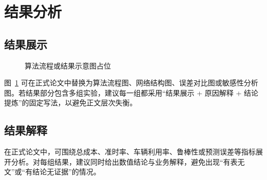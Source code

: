 \section{结果分析}

\subsection{结果展示}

\begin{figure}[H]
    \centering
    \fbox{\rule{0pt}{4.2cm}\rule{0.82\textwidth}{0pt}}
    \caption{算法流程或结果示意图占位}
    \label{fig:placeholder}
\end{figure}

图~\ref{fig:placeholder} 可在正式论文中替换为算法流程图、网络结构图、误差对比图或敏感性分析图。若结果部分包含多组实验，建议每一组都采用“结果展示 + 原因解释 + 结论提炼”的固定写法，以避免正文层次失衡。

\subsection{结果解释}

在正式论文中，可围绕总成本、准时率、车辆利用率、鲁棒性或预测误差等指标展开分析。对每组结果，建议同时给出数值结论与业务解释，避免出现“有表无文”或“有结论无证据”的情况。
